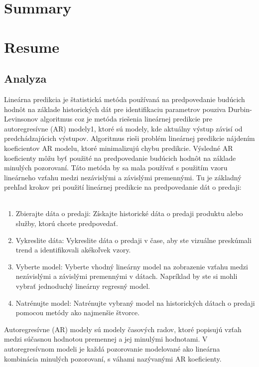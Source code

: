 
\chapter{Summary} \label{summary}

\chapter{Resume} \label{resume}
    \section{Analyza} \label{sk:analytic}
    Lineárna predikcia je štatistická metóda používaná na predpovedanie budúcich hodnôt na základe historických dát pre identifikaciu parametrov pouziva
    Durbin-Levinsonov algoritmus coz je metóda riešenia lineárnej predikcie pre autoregresívne (AR) modely1, ktoré sú modely, kde aktuálny výstup
    závisí od predchádzajúcich výstupov. Algoritmus rieši problém lineárnej predikcie nájdením koeficientov AR modelu, ktoré minimalizujú chybu predikcie.
    Výsledné AR koeficienty môžu byť použité na predpovedanie budúcich hodnôt na základe minulých pozorovaní. Táto metóda by sa mala
    používať s použitím vzoru lineárneho vzťahu medzi nezávislými a závislými premennými. Tu je základný prehľad krokov pri použití lineárnej
    predikcie na predpovedanie dát o predaji:\\
    \\
    \begin{enumerate}
    \item Zbierajte dáta o predaji: Získajte historické dáta o predaji produktu alebo služby, ktorú chcete predpovedať.
    \item Vykreslite dáta: Vykreslite dáta o predaji v čase, aby ste vizuálne preskúmali trend a identifikovali akékoľvek vzory.
    \item Vyberte model: Vyberte vhodný lineárny model na zobrazenie vzťahu medzi nezávislými a závislými premennými v dátach.
    Napríklad by ste si mohli vybrať jednoduchý lineárny regresný model.
    \item Natrénujte model: Natrénujte vybraný model na historických dátach o predaji pomocou metódy ako najmenšie štvorce.
    \end{enumerate}
    Autoregresívne (AR) modely sú modely časových radov, ktoré popisujú vzťah medzi súčasnou hodnotou premennej a jej minulými hodnotami.
    V autoregresívnom modeli je každá pozorovanie modelované ako lineárna kombinácia minulých pozorovaní, s váhami nazývanými AR koeficienty.
